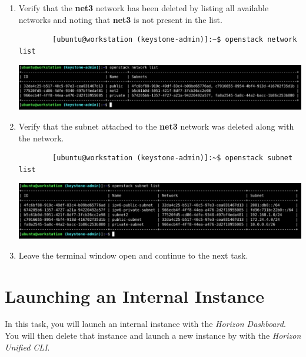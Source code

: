 \documentclass[letterpaper, 12pt]{article}
\begin{document}
\begin{enumerate}
    \item Verify that the \textbf{net3} network has been deleted by listing all available networks and noting that \textbf{net3} is not present in the list.
    \begin{lstlisting}
        [ubuntu@workstation (keystone-admin)]:~$ openstack network list
    \end{lstlisting}

    \begin{center}
        \includegraphics[width=\linewidth]{images/part3/step25.png}
    \end{center}

    \item Verify that the subnet attached to the \textbf{net3} network was deleted along with the network.
    \begin{lstlisting}
        [ubuntu@workstation (keystone-admin)]:~$ openstack subnet list
    \end{lstlisting}

    \begin{center}
        \includegraphics[width=\linewidth]{images/part3/step26.png}
    \end{center}

    \item Leave the terminal window open and continue to the next task.

\end{enumerate}

\section{Launching an Internal Instance}
\label{sec:launching_an_internal_instance}
In this task, you will launch an internal instance with the \textit{Horizon Dashboard}.
You will then delete that instance and launch a new instance by with the \textit{Horizon Unified CLI}.
\end{document}
